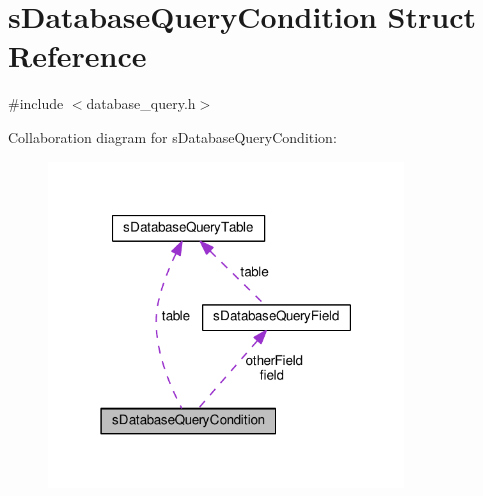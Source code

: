 \hypertarget{structsDatabaseQueryCondition}{}\section{s\+Database\+Query\+Condition Struct Reference}
\label{structsDatabaseQueryCondition}


{\ttfamily \#include $<$database\+\_\+query.\+h$>$}



Collaboration diagram for s\+Database\+Query\+Condition\+:\nopagebreak
\begin{figure}[H]
\begin{center}
\leavevmode
\includegraphics[width=267pt]{structsDatabaseQueryCondition__coll__graph}
\end{center}
\end{figure}

